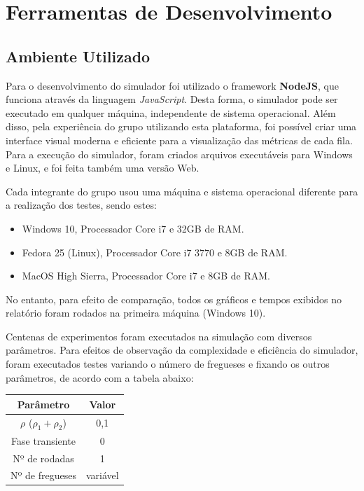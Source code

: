 \documentclass[a4paper,12pt]{report}
\begin{document}
\section{Ferramentas de Desenvolvimento}

\subsection{Ambiente Utilizado}
Para o desenvolvimento do simulador foi utilizado o framework \textbf{NodeJS}, que funciona através da linguagem \emph{JavaScript}. Desta forma, o simulador pode ser executado em qualquer máquina, independente de sistema operacional. Além disso, pela experiência do grupo utilizando esta plataforma, foi possível criar uma interface visual moderna e eficiente para a visualização das métricas de cada fila. Para a execução do simulador, foram criados arquivos executáveis para Windows e Linux, e foi feita também uma versão Web.

Cada integrante do grupo usou uma máquina e sistema operacional diferente para a realização dos testes, sendo estes:
\vspace{-1.5em}
\begin{itemize}
	\item Windows 10, Processador Core i7 e 32GB de RAM.
    \item Fedora 25 (Linux), Processador Core i7 3770 e 8GB de RAM.
    \item MacOS High Sierra, Processador Core i7 e 8GB de RAM.
\end{itemize}

No entanto, para efeito de comparação, todos os gráficos e tempos exibidos no relatório foram rodados na primeira máquina (Windows 10).

Centenas de experimentos foram executados na simulação com diversos parâmetros. Para efeitos de observação da complexidade e eficiência do simulador, foram executados testes variando o número de fregueses e fixando os outros parâmetros, de acordo com a tabela abaixo:

\begin{center}
\begin{tabular}{ c c }
  \hline
  \textbf{Parâmetro} & \textbf{Valor}\\
  \hline
  $\rho$ ($\rho_1 + \rho_2$) & 0,1\\
  Fase transiente & 0\\
  Nº de rodadas & 1\\
  Nº de fregueses & variável\\
  \hline
\end{tabular}
\end{center}
\end{document}
